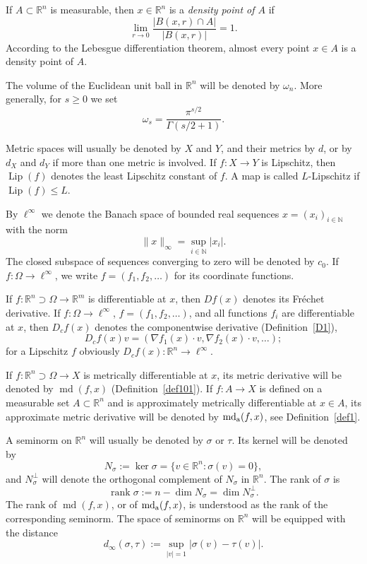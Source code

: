 \documentclass[12pt,leqno]{amsart}
\theoremstyle{definition}
\newcommand{\bbbr}{\mathbb R}
\def\md{\operatorname{md}}
\def\apmd{\operatorname{md_{\rm a}}}
\numberwithin{theorem}{section} \numberwithin{equation}{section}
\begin{document}
If $A\subset\bbbr^n$ is measurable, then $x\in\bbbr^n$ is a {\em density point of $A$} if
$$
\lim_{r\to 0}\frac{|B(x,r)\cap A|}{|B(x,r)|}=1.
$$
According to the Lebesgue differentiation theorem, almost every point $x\in A$ is a density point of $A$.

The volume of the Euclidean unit ball in $\mathbb R^n$ will be denoted by
$\omega_n$. More generally, for $s\geq 0$ we set
\[
        \omega_s=\frac{\pi^{s/2}}{\Gamma(s/2+1)} .
\]


Metric spaces will usually be denoted by $X$ and $Y$, and their metrics by
$d$, or by $d_X$ and $d_Y$ if more than one metric is involved. If
$f:X\to Y$ is Lipschitz, then $\operatorname{Lip}(f)$ denotes the least
Lipschitz constant of $f$. A map is called $L$-Lipschitz if
$\operatorname{Lip}(f)\leq L$.

By $\ell^\infty$ we denote the Banach space of bounded real sequences
$x=(x_i)_{i\in\mathbb N}$ with the norm
\[
        \|x\|_\infty=\sup_{i\in\mathbb N}|x_i|.
\]
The closed subspace of sequences converging to zero will be denoted by $c_0$.
If $f:\Omega\to \ell^\infty$, we write
$f=(f_1,f_2,\ldots)$ for its coordinate functions.

If $f:\bbbr^n\supset\Omega\to \mathbb R^m$ is differentiable at $x$, then
$Df(x)$ denotes its Fr\'echet derivative. If $f:\Omega\to\ell^\infty$,
$f=(f_1,f_2,\ldots)$, and all functions $f_i$ are differentiable at $x$, then
$D_c f(x)$ denotes the componentwise derivative (Definition~\ref{D1}),
\[
        D_c f(x)v=(\nabla f_1(x)\cdot v,\nabla f_2(x)\cdot v,\ldots);
\]
for a Lipschitz $f$ obviously $D_c f(x):\mathbb R^n\to\ell^\infty$.

If $f:\bbbr^n\supset\Omega\to X$ is metrically differentiable at $x$, its
metric derivative will be denoted by $\md(f,x)$ (Definition~\ref{def101}). If $f:A\to X$ is defined on a measurable set $A\subset\mathbb R^n$ and is approximately metrically
differentiable at $x\in A$, its approximate metric derivative will be denoted
by $\apmd(f,x)$, see Definition~\ref{def1}.

A seminorm on $\mathbb R^n$ will usually be denoted by $\sigma$ or $\tau$.
Its kernel will be denoted by
\[
        N_\sigma:=\ker\sigma=\{v\in\mathbb R^n:\sigma(v)=0\},
\]
and $N_\sigma^\perp$ will denote the orthogonal complement of $N_\sigma$ in
$\mathbb R^n$. The rank of $\sigma$ is
\[
        \operatorname{rank}\sigma
        :=n-\dim N_\sigma=\dim N_\sigma^\perp .
\]
The rank of $\md(f,x)$, or of $\apmd(f,x)$, is understood as the rank of the
corresponding seminorm. The space of seminorms on $\mathbb R^n$ will be
equipped with the distance
\[
        d_\infty(\sigma,\tau)
        :=\sup_{|v|=1}|\sigma(v)-\tau(v)|.
\]
\end{document}
